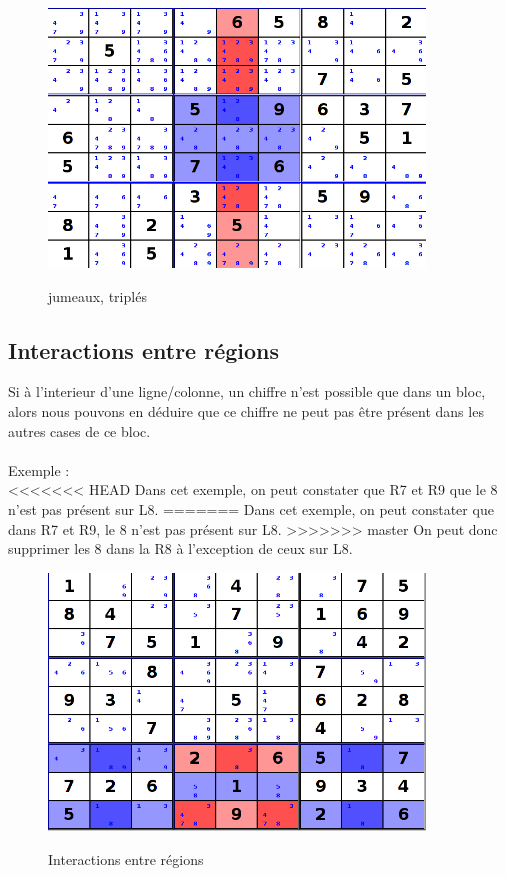\begin{figure}[ht]
  \caption{\label{annexe3} jumeaux, triplés}
  \includegraphics [width=100mm]{images/PairTriplet.png} \\[0.5cm]
\end{figure}

\newpage

\subsection{Interactions entre régions}
Si à l’interieur d’une ligne/colonne, un chiffre n’est possible que dans un bloc, alors
nous pouvons en déduire que ce chiffre ne peut pas être présent dans les autres cases de
ce bloc.\\
\\

Exemple :\\
<<<<<<< HEAD
Dans cet exemple, on peut constater que R7 et R9 que le 8 n'est pas présent sur L8. 
=======
Dans cet exemple, on peut constater que dans R7 et R9, le 8 n'est pas présent sur L8. 
>>>>>>> master
On peut donc supprimer les 8 dans la R8 à l'exception de ceux sur L8.

\begin{figure}[ht]
  \caption{\label{annexe4} Interactions entre régions}
  \includegraphics [width=100mm]{images/InteractionBetweenSector.png} \\[0.5cm]
\end{figure}

